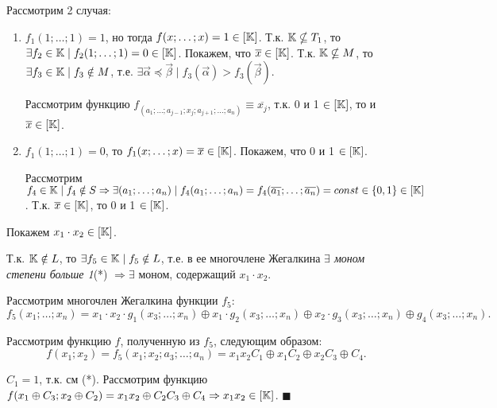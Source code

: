     Рассмотрим 2 случая:
    \begin{enumerate}
        \item $f_1(1; \dots; 1) = 1$, но тогда $f(x; \dots; x) = 1 \in [\mathbb{K}]$. Т.к. $\mathbb{K} \nsubseteq T_1$, то $\exists f_2 \in \mathbb{K} \mid f_2(1;\dots;1) = 0 \in [\mathbb{K}]$.
        Покажем, что $\overline{x} \in [\mathbb{K}]$. Т.к. $\mathbb{K} \nsubseteq M$, то $\exists f_3 \in \mathbb{K} \mid f_3 \notin M$, т.е. $\exists \vec{\alpha} \preccurlyeq \vec{\beta} \mid f_3(\vec{\alpha}) > f_3(\vec{\beta})$.

        Рассмотрим функцию $f_(a_1; \dots; a_{j-1}; x_j; a_{j+1}; \dots; a_n) \equiv \overline{x_j}$, т.к. 0 и 1 $\in [\mathbb{K}]$, то и $\overline{x} \in [\mathbb{K}]$.

        \item $f_1(1; \dots; 1) = 0$, то $f_1(x; \dots; x) = \overline{x} \in [\mathbb{K}]$. Покажем, что 0 и 1 $\in [\mathbb{K}]$.
        
        Рассмотрим $f_4 \in \mathbb{K} \mid f_4 \notin S \Rightarrow \exists (a_1; \dots; a_n) \mid f_4(a_1; \dots; a_n) = f_4(\overline{a_1}; \dots; \overline{a_n}) = const \in \{0,1\} \in [\mathbb{K}]$.
        Т.к. $\overline{x} \in [\mathbb{K}]$, то 0 и 1 $\in [\mathbb{K}]$.
    \end{enumerate}

    Покажем $x_1 \cdot x_2 \in [\mathbb{K}]$.

    Т.к. $\mathbb{K} \notin L$, то $\exists f_5 \in \mathbb{K} \mid f_5 \notin L$, т.е. в ее многочлене Жегалкина \emph{$\exists$ моном степени больше 1}(*) $\Rightarrow \exists$  моном, содержащий $x_1 \cdot x_2$.

    Рассмотрим многочлен Жегалкина функции $f_5$:
    $$
        f_5(x_1; \dots; x_n) = x_1 \cdot x_2 \cdot g_1(x_3; \dots; x_n) \oplus x_1 \cdot g_2(x_3;\dots;x_n) \oplus x_2 \cdot g_3(x_3; \dots; x_n) \oplus g_4(x_3; \dots; x_n).
    $$

    Рассмотрим функцию $f$, полученную из $f_5$, следующим образом:
    $$
    f(x_1; x_2) = f_5(x_1; x_2; a_3; \dots; a_n) = x_1x_2C_1 \oplus x_1C_2 \oplus x_2C_3 \oplus C_4.
    $$

    $C_1 = 1$, т.к. см (*). Рассмотрим функцию $f(x_1 \oplus C_3; x_2 \oplus C_2) = x_1x_2 \oplus C_2C_3 \oplus C_4 \Rightarrow x_1x_2 \in [\mathbb{K}]$. $\blacksquare$

